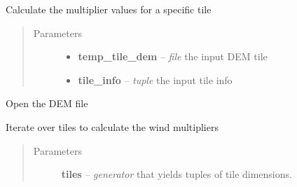 \documentclass[letterpaper,10pt,english]{sphinxmanual}
\begin{document}
\begin{fulllineitems}

\begin{fulllineitems}
\label{docs/all_multipliers:all_multipliers.Multipliers.multipliers_calculate}
Calculate the multiplier values for a specific tile
\begin{quote}\begin{description}
\item[{Parameters}] \leavevmode\begin{itemize}
\item {} 
\textbf{temp\_tile\_dem} -- \emph{file} the input DEM tile

\item {} 
\textbf{tile\_info} -- \emph{tuple} the input tile info

\end{itemize}

\end{description}\end{quote}

\end{fulllineitems}



\begin{fulllineitems}
\label{docs/all_multipliers:all_multipliers.Multipliers.open_dem}
Open the DEM file

\end{fulllineitems}



\begin{fulllineitems}
\label{docs/all_multipliers:all_multipliers.Multipliers.parallelise_on_tiles}
Iterate over tiles to calculate the wind multipliers
\begin{quote}\begin{description}
\item[{Parameters}] \leavevmode
\textbf{tiles} -- \emph{generator} that yields tuples of tile dimensions.

\end{description}\end{quote}

\end{fulllineitems}


\end{fulllineitems}
\end{document}
